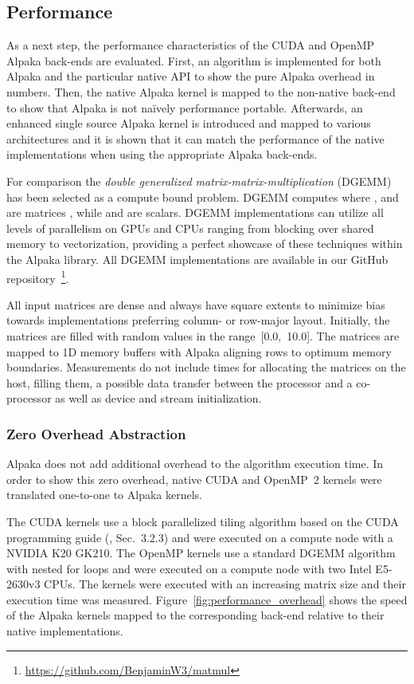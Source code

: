 \documentclass[10pt, twocolumn]{article}
\newcommand{\alpaka}{Alpaka\xspace}
\newcommand{\cuda}{{CUDA}\xspace}
\newcommand{\openmp}{{OpenMP}\xspace}
\newcommand{\nvidia}{{NVIDIA}\xspace}
\newcommand{\intel}{{Intel}\xspace}
\newcommand{\github}{{GitHub}\xspace}
\begin{document}
\subsection{Performance}
As a next step, the performance characteristics of the \cuda and \openmp \alpaka back-ends are evaluated.
First, an algorithm is implemented for both \alpaka and the particular native API to show the pure \alpaka overhead in numbers.
Then, the native \alpaka kernel is mapped to the non-native back-end to show that \alpaka is not na\"{i}vely performance portable.
Afterwards, an enhanced  single source \alpaka kernel is introduced and mapped to various architectures and it is shown that it can match the performance of the native implementations when using the appropriate \alpaka back-ends.

For comparison the \emph{double generalized matrix-matrix-multiplication} (DGEMM) has been selected as a compute bound problem.
DGEMM computes  where ,  and  are matrices ,  while  and  are scalars.
DGEMM implementations can utilize all levels of parallelism on GPUs and CPUs ranging from blocking over shared memory to vectorization, providing a perfect showcase of these techniques within the \alpaka library.
All DGEMM implementations are available in our \github repository~\footnote{\url{https://github.com/BenjaminW3/matmul}}.

All input matrices are dense and always have square extents to minimize bias towards implementations preferring column- or row-major layout.
Initially, the matrices are filled with random values in the range~[0.0,~10.0].
The matrices are mapped to 1D memory buffers with \alpaka aligning rows to optimum memory boundaries.
Measurements do not include times for allocating the matrices on the host, filling them, a possible data transfer between the processor and a co-processor as well as device and stream initialization.

\hfill
\subsubsection{Zero Overhead Abstraction}
\alpaka does not add additional overhead to the algorithm execution time.
In order to show this zero overhead, native \cuda and \openmp~2 kernels were translated one-to-one to \alpaka kernels.

The \cuda kernels use a block parallelized tiling algorithm based on the \cuda programming guide (\cite{CUDAPG}, Sec.~3.2.3) and were executed on a compute node with a \nvidia K20 GK210.
The \openmp kernels use a standard DGEMM algorithm with nested for loops and were executed on a compute node with two \intel E5-2630v3 CPUs.
The kernels were executed with an increasing matrix size and their execution time was measured.
Figure~\ref{fig:performance_overhead} shows the speed of the \alpaka kernels mapped to the corresponding back-end relative to their native implementations.
\end{document}

